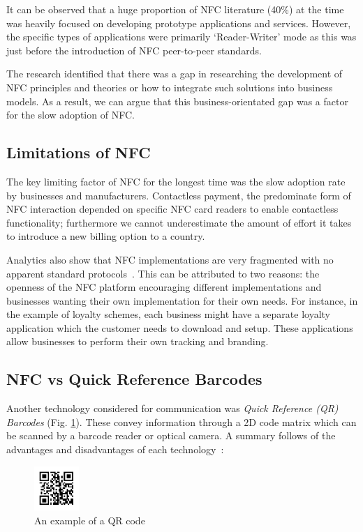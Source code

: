 It can be observed that a huge proportion of NFC literature (40\%) at the time was heavily focused on developing prototype applications and services. However, the specific types of applications were primarily `Reader-Writer' mode as this was just before the introduction of NFC peer-to-peer standards.

The research identified that there was a gap in researching the development of NFC principles and theories or how to integrate such solutions into business models. As a result, we can argue that this business-orientated gap was a factor for the slow adoption of NFC.
\subsection{Limitations of NFC}
The key limiting factor of NFC for the longest time was the slow adoption rate by businesses and manufacturers. Contactless payment, the predominate form of NFC interaction depended on specific NFC card readers to enable contactless functionality; furthermore we cannot underestimate the amount of effort it takes to introduce a new billing option to a country.

Analytics also show that NFC implementations are very fragmented with no apparent standard protocols~\cite{fragmentednfc}. This can be attributed to two reasons: the openness of the NFC platform encouraging different implementations and businesses wanting their own implementation for their own needs. For instance, in the example of loyalty schemes, each business might have a separate loyalty application which the customer needs to download and setup. These applications allow businesses to perform their own tracking and branding.

\subsection{NFC vs Quick Reference Barcodes}
\label{sec:NFCvsQR}
Another technology considered for communication was \emph{Quick Reference (QR) Barcodes} (Fig. \ref{fig:qrcode}). These convey information through a 2D code matrix which can be scanned by a barcode reader or optical camera. A summary follows of the advantages and disadvantages of each technology~\cite{nfcadv}\cite{qradv}:

\begin{figure}[H]
  \centering
    \includegraphics[width=0.15\textwidth]{img/qrcode.png}
      \caption{An example of a QR code}
       \label{fig:qrcode}
\end{figure}


